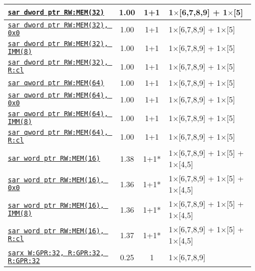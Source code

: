 \documentclass[a4paper,english,fontsize=9]{scrartcl}
\begin{document}
\begin{longtable}{p{}ccL{.25\textwidth}}
  \midrule
  \texttt{\href{https://felixcloutier.com/x86/SAL:SAR:SHL:SHR.html}{sar dword ptr RW:MEM(32)}} & 1.00 & 1+1 & 1\(\times\)[6,7,8,9] + 1\(\times\)[5] \\
  \midrule
  \texttt{\href{https://felixcloutier.com/x86/SAL:SAR:SHL:SHR.html}{sar dword ptr RW:MEM(32), 0x0}} & 1.00 & 1+1 & 1\(\times\)[6,7,8,9] + 1\(\times\)[5] \\
  \midrule
  \texttt{\href{https://felixcloutier.com/x86/SAL:SAR:SHL:SHR.html}{sar dword ptr RW:MEM(32), IMM(8)}} & 1.00 & 1+1 & 1\(\times\)[6,7,8,9] + 1\(\times\)[5] \\
  \midrule
  \texttt{\href{https://felixcloutier.com/x86/SAL:SAR:SHL:SHR.html}{sar dword ptr RW:MEM(32), R:cl}} & 1.00 & 1+1 & 1\(\times\)[6,7,8,9] + 1\(\times\)[5] \\
  \midrule
  \texttt{\href{https://felixcloutier.com/x86/SAL:SAR:SHL:SHR.html}{sar qword ptr RW:MEM(64)}} & 1.00 & 1+1 & 1\(\times\)[6,7,8,9] + 1\(\times\)[5] \\
  \midrule
  \texttt{\href{https://felixcloutier.com/x86/SAL:SAR:SHL:SHR.html}{sar qword ptr RW:MEM(64), 0x0}} & 1.00 & 1+1 & 1\(\times\)[6,7,8,9] + 1\(\times\)[5] \\
  \midrule
  \texttt{\href{https://felixcloutier.com/x86/SAL:SAR:SHL:SHR.html}{sar qword ptr RW:MEM(64), IMM(8)}} & 1.00 & 1+1 & 1\(\times\)[6,7,8,9] + 1\(\times\)[5] \\
  \midrule
  \texttt{\href{https://felixcloutier.com/x86/SAL:SAR:SHL:SHR.html}{sar qword ptr RW:MEM(64), R:cl}} & 1.00 & 1+1 & 1\(\times\)[6,7,8,9] + 1\(\times\)[5] \\
  \midrule
  \texttt{\href{https://felixcloutier.com/x86/SAL:SAR:SHL:SHR.html}{sar word ptr RW:MEM(16)}} & 1.38 & 1+1* & 1\(\times\)[6,7,8,9] + 1\(\times\)[5] + 1\(\times\)[4,5] \\
  \midrule
  \texttt{\href{https://felixcloutier.com/x86/SAL:SAR:SHL:SHR.html}{sar word ptr RW:MEM(16), 0x0}} & 1.36 & 1+1* & 1\(\times\)[6,7,8,9] + 1\(\times\)[5] + 1\(\times\)[4,5] \\
  \midrule
  \texttt{\href{https://felixcloutier.com/x86/SAL:SAR:SHL:SHR.html}{sar word ptr RW:MEM(16), IMM(8)}} & 1.36 & 1+1* & 1\(\times\)[6,7,8,9] + 1\(\times\)[5] + 1\(\times\)[4,5] \\
  \midrule
  \texttt{\href{https://felixcloutier.com/x86/SAL:SAR:SHL:SHR.html}{sar word ptr RW:MEM(16), R:cl}} & 1.37 & 1+1* & 1\(\times\)[6,7,8,9] + 1\(\times\)[5] + 1\(\times\)[4,5] \\
  \midrule
  \texttt{\href{https://felixcloutier.com/x86/SARX:SHLX:SHRX.html}{sarx W:GPR:32, R:GPR:32, R:GPR:32}} & 0.25 & 1 & 1\(\times\)[6,7,8,9] \\

\end{longtable}
\end{document}
